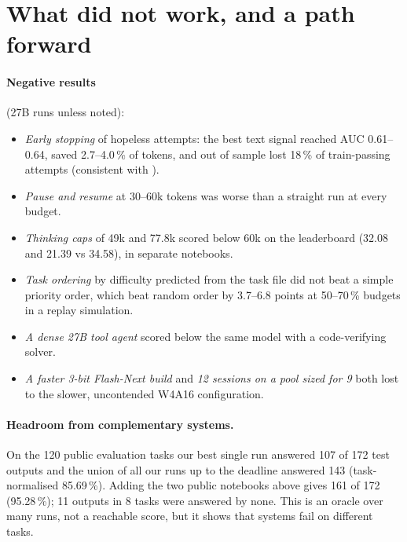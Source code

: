 \documentclass[11pt]{article}
\begin{document}
\section{What did not work, and a path forward}\label{sec:progress}
\paragraph{Negative results} (27B runs unless noted):
\begin{itemize}
\item \emph{Early stopping} of hopeless attempts: the best text signal reached AUC 0.61--0.64, saved 2.7--4.0\,\% of tokens, and out of sample lost 18\,\% of train-passing attempts (consistent with \cite{notnitsuj2026}).
\item \emph{Pause and resume} at 30--60k tokens was worse than a straight run at every budget.
\item \emph{Thinking caps} of 49k and 77.8k scored below 60k on the leaderboard (32.08 and 21.39 vs 34.58), in separate notebooks.
\item \emph{Task ordering} by difficulty predicted from the task file did not beat a simple priority order, which beat random order by 3.7--6.8 points at 50--70\,\% budgets in a replay simulation.
\item \emph{A dense 27B tool agent} scored below the same model with a code-verifying solver.
\item \emph{A faster 3-bit Flash-Next build} and \emph{12 sessions on a pool sized for 9} both lost to the slower, uncontended W4A16 configuration.
\end{itemize}

\paragraph{Headroom from complementary systems.} On the 120 public evaluation tasks our best single run answered 107 of 172 test outputs and the union of all our runs up to the deadline answered 143 (task-normalised 85.69\,\%). Adding the two public notebooks above gives 161 of 172 (95.28\,\%); 11 outputs in 8 tasks were answered by none. This is an oracle over many runs, not a reachable score, but it shows that systems fail on different tasks.
\end{document}
